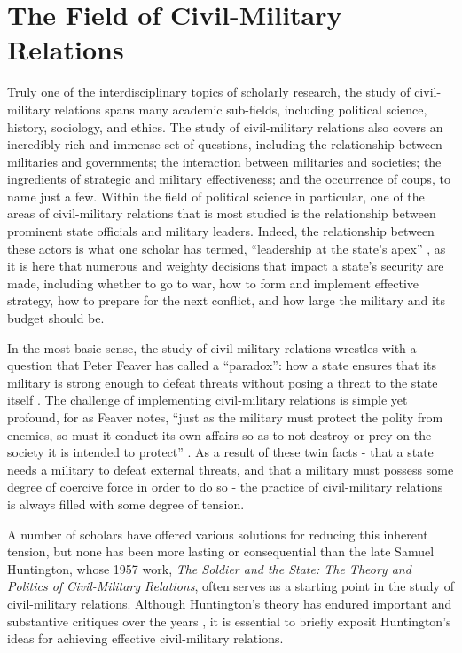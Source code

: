 \documentclass[
  12pt,
  oneside]{memoir}
\begin{document}
\hypertarget{the-field-of-civil-military-relations}{%
\chapter{The Field of Civil-Military Relations}\label{the-field-of-civil-military-relations}}

Truly one of the interdisciplinary topics of scholarly research, the study of civil-military relations spans many academic sub-fields, including political science, history, sociology, and ethics. The study of civil-military relations also covers an incredibly rich and immense set of questions, including the relationship between militaries and governments; the interaction between militaries and societies; the ingredients of strategic and military effectiveness; and the occurrence of coups, to name just a few. Within the field of political science in particular, one of the areas of civil-military relations that is most studied is the relationship between prominent state officials and military leaders. Indeed, the relationship between these actors is what one scholar has termed, ``leadership at the state's apex'' \autocite[380]{brooks_risa_integrating_2019}, as it is here that numerous and weighty decisions that impact a state's security are made, including whether to go to war, how to form and implement effective strategy, how to prepare for the next conflict, and how large the military and its budget should be.

In the most basic sense, the study of civil-military relations wrestles with a question that Peter Feaver has called a ``paradox'': how a state ensures that its military is strong enough to defeat threats without posing a threat to the state itself \autocite[150]{feaver_civil-military_1996}. The challenge of implementing civil-military relations is simple yet profound, for as Feaver notes, ``just as the military must protect the polity from enemies, so must it conduct its own affairs so as to not destroy or prey on the society it is intended to protect'' \autocite[214]{feaver_civil-military_1999}. As a result of these twin facts - that a state needs a military to defeat external threats, and that a military must possess some degree of coercive force in order to do so - the practice of civil-military relations is always filled with some degree of tension.

A number of scholars have offered various solutions for reducing this inherent tension, but none has been more lasting or consequential than the late Samuel Huntington, whose 1957 work, \emph{The Soldier and the State: The Theory and Politics of Civil-Military Relations}, often serves as a starting point in the study of civil-military relations. Although Huntington's theory has endured important and substantive critiques over the years \autocites[for example, see][]{janowitz_professional_1960,finer_man_1962,cohen_supreme_2003,feaver_armed_2003,brooks_paradoxes_2020}, it is essential to briefly exposit Huntington's ideas for achieving effective civil-military relations.
\end{document}
